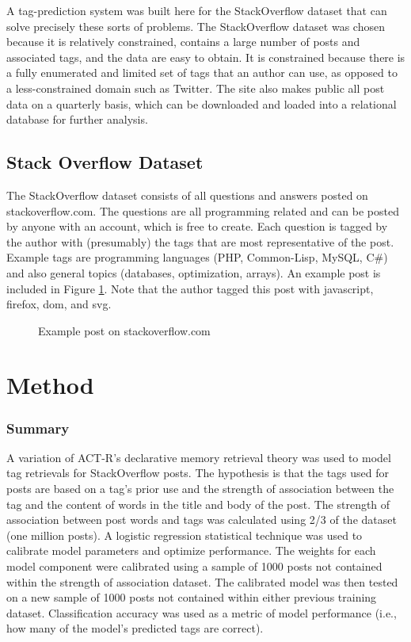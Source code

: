 \documentclass[10pt,letterpaper]{article}
\begin{document}
A tag-prediction system was built here for the StackOverflow dataset that can solve precisely these sorts of problems.
The StackOverflow dataset was chosen because it is relatively constrained, contains a large number of posts and associated tags, and the data are easy to obtain.
It is constrained because there is a fully enumerated and limited set of tags that an author can use, as opposed to a less-constrained domain such as Twitter.
The site also makes public all post data on a quarterly basis, which can be downloaded and loaded into a relational database for further analysis.

\subsection{Stack Overflow Dataset}

The StackOverflow dataset consists of all questions and answers posted on stackoverflow.com.
The questions are all programming related and can be posted by anyone with an account, which is free to create.
Each question is tagged by the author with (presumably) the tags that are most representative of the post.
Example tags are programming languages (PHP, Common-Lisp, MySQL, C\#) and also general topics (databases, optimization, arrays).
An example post is included in Figure \ref{fig:examplePost}.
Note that the author tagged this post with javascript, firefox, dom, and svg.

\begin{figure}[ht]
  \centering
  \caption{Example post on stackoverflow.com}
  \label{fig:examplePost}
\end{figure}

\section{Method}

\subsubsection{Summary}

A variation of ACT-R's declarative memory retrieval theory \cite{Anderson2004} was used to model tag retrievals for StackOverflow posts.
The hypothesis is that the tags used for posts are based on a tag's prior use and the strength of association between the tag and the content of words in the title and body of the post.
The strength of association between post words and tags was calculated using 2/3 of the dataset (one million posts).
A logistic regression statistical technique was used to calibrate model parameters and optimize performance.
The weights for each model component were calibrated using a sample of \num{1000} posts not contained within the strength of association dataset.
The calibrated model was then tested on a new sample of \num{1000} posts not contained within either previous training dataset.
Classification accuracy was used as a metric of model performance (i.e., how many of the model's predicted tags are correct).
\end{document}
